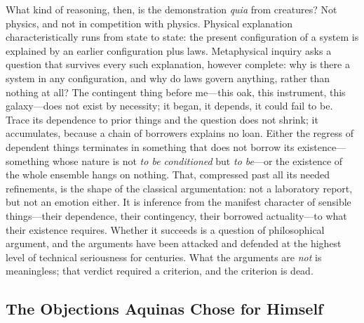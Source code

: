 What kind of reasoning, then, is the demonstration \emph{quia} from creatures? Not physics, and not in competition with physics. Physical explanation characteristically runs from state to state: the present configuration of a system is explained by an earlier configuration plus laws. Metaphysical inquiry asks a question that survives every such explanation, however complete: why is there a system in any configuration, and why do laws govern anything, rather than nothing at all? The contingent thing before me---this oak, this instrument, this galaxy---does not exist by necessity; it began, it depends, it could fail to be. Trace its dependence to prior things and the question does not shrink; it accumulates, because a chain of borrowers explains no loan. Either the regress of dependent things terminates in something that does not borrow its existence---something whose nature is not \emph{to be conditioned} but \emph{to be}---or the existence of the whole ensemble hangs on nothing. That, compressed past all its needed refinements, is the shape of the classical argumentation: not a laboratory report, but not an emotion either. It is inference from the manifest character of sensible things---their dependence, their contingency, their borrowed actuality---to what their existence requires. Whether it succeeds is a question of philosophical argument, and the arguments have been attacked and defended at the highest level of technical seriousness for centuries. What the arguments are \emph{not} is meaningless; that verdict required a criterion, and the criterion is dead.

\subsection{The Objections Aquinas Chose for Himself}

